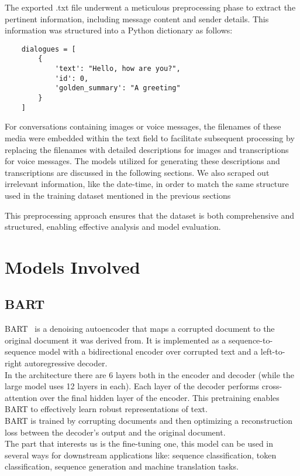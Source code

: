 \documentclass[10pt,twocolumn,letterpaper]{article}
\begin{document}
The exported .txt file underwent a meticulous preprocessing phase to extract the pertinent information, including message content and sender details. 
This information was structured into a Python dictionary as follows:

\begin{lstlisting}
    dialogues = [
        {
            'text': "Hello, how are you?",
            'id': 0,
            'golden_summary': "A greeting"
        }
    ]
\end{lstlisting}
For conversations containing images or voice messages, the filenames of these media were embedded within the text field to facilitate subsequent processing by replacing the filenames with detailed descriptions for images and transcriptions for voice messages. 
The models utilized for generating these descriptions and transcriptions are discussed in the following sections.
We also scraped out irrelevant information, like the date-time, in order to match the same structure used in the training dataset mentioned in the previous sections 

This preprocessing approach ensures that the dataset is both comprehensive and structured, enabling effective analysis and model evaluation.
\section{Models Involved}

\subsection{BART}

BART~\cite{lewis2019bart} is a denoising autoencoder that maps a corrupted document to the original document it was derived from. It is implemented as a sequence-to-sequence model with a bidirectional encoder over 
corrupted text and a left-to-right autoregressive decoder. \\
In the architecture there are 6 layers both in the encoder and decoder (while the large model uses 12 layers in each). Each layer of the decoder performs cross-attention over the final hidden layer of the 
encoder. This pretraining enables BART to effectively learn robust representations of text.\\
BART is trained by corrupting documents and then optimizing a reconstruction loss between the decoder's output and the original document. \\
The part that interests us is the fine-tuning one, this model can be used in several ways for downstream applications like: sequence classification, token classification, sequence generation
and machine translation tasks. 
\end{document}
